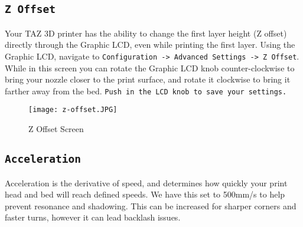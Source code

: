 \subsection{\texttt{Z Offset}}
Your TAZ 3D printer has the ability to change the first layer height (Z offset) directly through the Graphic LCD, even while printing the first layer. Using the Graphic LCD, navigate to \texttt{Configuration -> Advanced Settings -> Z Offset}. While in this screen you can rotate the Graphic LCD knob counter-clockwise to bring your nozzle closer to the print surface, and rotate it clockwise to bring it farther away from the bed. \texttt{Push in the LCD knob to save your settings.}

\begin{figure}[H]
\centering
\texttt{[image: z-offset.JPG]}
\caption{Z Offset Screen}
\label{fig:Z_offset_screen}
\end{figure}



\subsection{\texttt{Acceleration}}
Acceleration is the derivative of speed, and determines how quickly your print head and bed will reach defined speeds. We have this set to 500mm/s\textsuperscript{} to help prevent resonance and shadowing. This can be increased for sharper corners and faster turns, however it can lead backlash issues.

